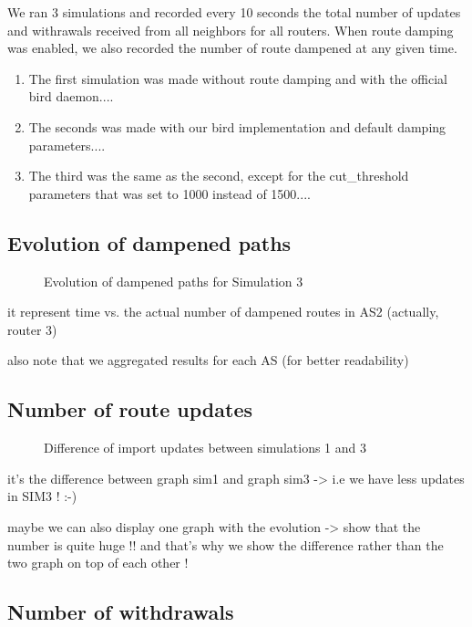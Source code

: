 \documentclass[a4paper,english]{IEEEtran}
\begin{document}
We ran 3 simulations and recorded every 10 seconds the total number
of updates and withrawals received from all neighbors for all routers.
When route damping was enabled, we also recorded the number of route
dampened at any given time. 
\begin{enumerate}
\item The first simulation was made without route damping and with the official
bird daemon.... 
\item The seconds was made with our bird implementation and default damping
parameters.... 
\item The third was the same as the second, except for the cut\_threshold
parameters that was set to 1000 instead of 1500.... 
\end{enumerate}

\subsection{Evolution of dampened paths}

\begin{figure}
\caption{Evolution of dampened paths for Simulation 3}

\end{figure}

it represent time vs. the actual number of dampened routes in AS2
(actually, router 3)

also note that we aggregated results for each AS (for better readability)


\subsection{Number of route updates}

\begin{figure}
\caption{Difference of import updates between simulations 1 and 3}

\end{figure}


it's the difference between graph sim1 and graph sim3 -> i.e we have
less updates in SIM3 ! :-)

maybe we can also display one graph with the evolution -> show that
the number is quite huge !! and that's why we show the difference
rather than the two graph on top of each other !


\subsection{Number of withdrawals}
\end{document}
